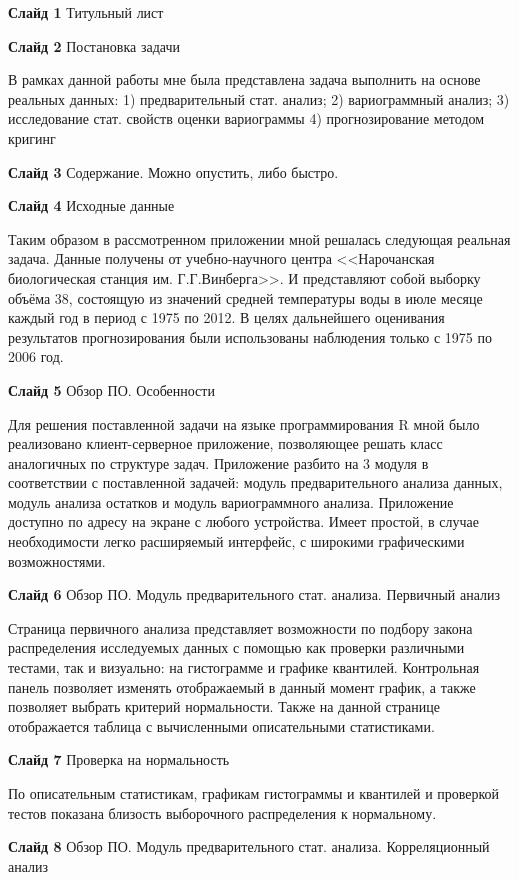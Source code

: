 \documentclass[a4paper,10pt]{report}
\begin{document}
\textbf{Слайд 1} Титульный лист

\textbf{Слайд 2} Постановка задачи

В рамках данной работы мне была представлена задача выполнить на основе реальных данных: 1) предварительный стат. анализ; 2) вариограммный анализ; 3) исследование стат. свойств оценки вариограммы 4) прогнозирование методом кригинг

\textbf{Слайд 3} Содержание. Можно опустить, либо быстро.

\textbf{Слайд 4} Исходные данные

Таким образом в рассмотренном приложении мной решалась следующая реальная задача. Данные получены от учебно-научного центра <<Нарочанская биологическая станция им. Г.Г.Винберга>>. И представляют собой выборку объёма 38, состоящую из значений средней температуры воды в июле месяце каждый год в период с 1975 по 2012. В целях дальнейшего оценивания результатов прогнозирования были использованы наблюдения только с 1975 по 2006 год.

\textbf{Слайд 5} Обзор ПО. Особенности

Для решения поставленной задачи на языке программирования R мной было реализовано клиент-серверное приложение, позволяющее решать класс аналогичных по структуре задач. Приложение разбито на 3 модуля в соответствии с поставленной задачей: модуль предварительного анализа данных, модуль анализа остатков и  модуль вариограммного анализа. Приложение доступно по адресу на экране с любого устройства. Имеет простой, в случае необходимости легко расширяемый интерфейс, с широкими графическими возможностями.

\textbf{Слайд 6} Обзор ПО. Модуль предварительного стат. анализа. Первичный анализ

Страница первичного анализа представляет возможности по подбору закона распределения исследуемых данных с помощью как проверки различными тестами, так и визуально: на гистограмме и графике квантилей. Контрольная панель позволяет изменять отображаемый в данный момент график, а также позволяет выбрать критерий нормальности. Также на данной странице отображается таблица с вычисленными описательными статистиками.

\textbf{Слайд 7} Проверка на нормальность

По описательным статистикам, графикам гистограммы и квантилей и проверкой тестов показана близость выборочного распределения к нормальному.

\textbf{Слайд 8} Обзор ПО. Модуль предварительного стат. анализа. Корреляционный анализ
\end{document}
